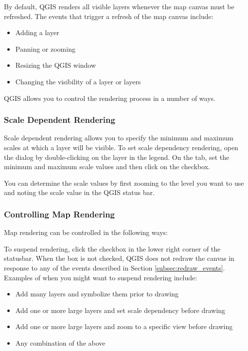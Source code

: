 By default, QGIS renders all visible layers whenever the map canvas must be
refreshed. The events that trigger a refresh of the map canvas include:

\begin{itemize}
\item Adding a layer
\item Panning or zooming
\item Resizing the QGIS window
\item Changing the visibility of a layer or layers
\end{itemize}

QGIS allows you to control the rendering process in a number of ways.

\subsubsection{Scale Dependent Rendering}
\label{label_scaledepend}

Scale dependent rendering allows you to specify the minimum and maximum
scales at which a layer will be visible.  To set scale dependency rendering,
open the  dialog by double-clicking on the layer in the 
legend. On the  tab, set the minimum and maximum scale values and then
click on the  checkbox.

You can determine the scale values by first zooming to the level you want
to use and noting the scale value in the QGIS status bar.

\subsubsection{Controlling Map Rendering}\label{label_controlmap}

Map rendering can be controlled in the following ways:

\label{label_suspendrender}

To suspend rendering, click the  checkbox in the lower right
corner of the statusbar. When the  box is not checked, QGIS
does not redraw the canvas in response to any of the events described in
Section \ref{subsec:redraw_events}. Examples of when you might want to suspend
rendering include:

\begin{itemize}
\item Add many layers and symbolize them prior to drawing
\item Add one or more large layers and set scale dependency before drawing
\item Add one or more large layers and zoom to a specific view before drawing
\item Any combination of the above
\end{itemize}

